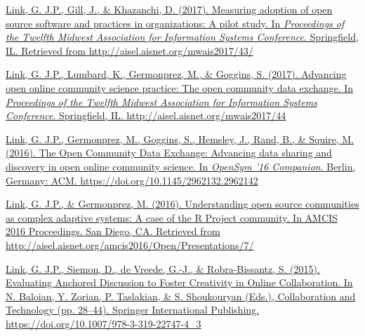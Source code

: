 \Gap
\NumberedItem{[5]}
\href{http://aisel.aisnet.org/mwais2017/43/}
{
\underline{Link, G. J.P.}, Gill, J., \& Khazanchi, D. (2017). Measuring adoption of open source software and practices in organizations: A pilot study. In \textit{Proceedings of the Twelfth Midwest Association for Information Systems Conference}. Springfield, IL. Retrieved from \url{http://aisel.aisnet.org/mwais2017/43/}
}

\Gap
\NumberedItem{[4]}
\href{http://aisel.aisnet.org/mwais2017/44}
{
\underline{Link, G. J.P.}, Lumbard, K., Germonprez, M., \& Goggins, S. (2017). Advancing open online community science practice: The open community data exchange. In \textit{Proceedings of the Twelfth Midwest Association for Information Systems Conference}. Springfield, IL. \url{http://aisel.aisnet.org/mwais2017/44}
}

\Gap
\NumberedItem{[3]}
\href{https://doi.org/10.1145/2962132.2962142}
{
\underline{Link, G. J.P.}, Germonprez, M., Goggins, S., Hemsley, J., Rand, B., \& Squire, M. (2016). The Open Community Data Exchange: Advancing data sharing and discovery in open online community science. In \textit{OpenSym ’16 Companion}. Berlin, Germany: ACM. \url{https://doi.org/10.1145/2962132.2962142}
}

\Gap
\NumberedItem{[2]}
\href{http://aisel.aisnet.org/amcis2016/Open/Presentations/7/}
{
\underline{Link, G. J.P.}, \& Germonprez, M. (2016). Understanding open source communities as complex adaptive systems: A case of the R Project community. In AMCIS 2016 Proceedings. San Diego, CA. Retrieved from \url{http://aisel.aisnet.org/amcis2016/Open/Presentations/7/}
}

\Gap
\NumberedItem{[1]}
\href{https://doi.org/10.1007/978-3-319-22747-4_3}
{
\underline{Link, G. J.P.}, Siemon, D., de Vreede, G.-J., \& Robra-Bissantz, S. (2015). 
Evaluating Anchored Discussion to Foster Creativity in Online Collaboration. 
In N. Baloian, Y. Zorian, P. Taslakian, \& S. Shoukouryan (Eds.), Collaboration and Technology (pp. 28--44). 
Springer International Publishing. 
\url{https://doi.org/10.1007/978-3-319-22747-4_3}
}


\endgroup